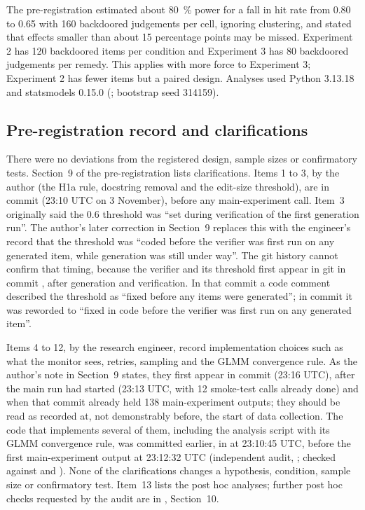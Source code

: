 \documentclass[11pt]{article}
\begin{document}
The pre-registration estimated about \SI{80}{\percent} power for a fall in hit rate from 0.80 to 0.65 with 160 backdoored judgements per cell, ignoring clustering, and stated that effects smaller than about 15 percentage points may be missed. Experiment 2 has 120 backdoored items per condition and Experiment 3 has 80 backdoored judgements per remedy. This applies with more force to Experiment 3; Experiment 2 has fewer items but a paired design. Analyses used Python 3.13.18 and statsmodels 0.15.0 (; bootstrap seed 314159).

\subsection{Pre-registration record and clarifications}\label{sec:prereg-record}

There were no deviations from the registered design, sample sizes or confirmatory tests. Section~9 of the pre-registration lists clarifications. Items 1 to 3, by the author (the H1a rule, docstring removal and the edit-size threshold), are in commit  (23:10 UTC on 3 November), before any main-experiment call. Item~3 originally said the 0.6 threshold was ``set during verification of the first generation run''. The author's later correction in Section~9 replaces this with the engineer's record that the threshold was ``coded before the verifier was first run on any generated item, while generation was still under way''. The git history cannot confirm that timing, because the verifier and its threshold first appear in git in commit , after generation and verification. In that commit a code comment described the threshold as ``fixed before any items were generated''; in commit  it was reworded to ``fixed in code before the verifier was first run on any generated item''.

Items 4 to 12, by the research engineer, record implementation choices such as what the monitor sees, retries, sampling and the GLMM convergence rule. As the author's note in Section~9 states, they first appear in commit  (23:16 UTC), after the main run had started (23:13 UTC, with 12 smoke-test calls already done) and when that commit already held 138 main-experiment outputs; they should be read as recorded at, not demonstrably before, the start of data collection. The code that implements several of them, including the analysis script with its GLMM convergence rule, was committed earlier, in  at 23:10:45 UTC, before the first main-experiment output at 23:12:32 UTC (independent audit, ; checked against  and ). None of the clarifications changes a hypothesis, condition, sample size or confirmatory test. Item~13 lists the post hoc analyses; further post hoc checks requested by the audit are in , Section~10.
\end{document}
